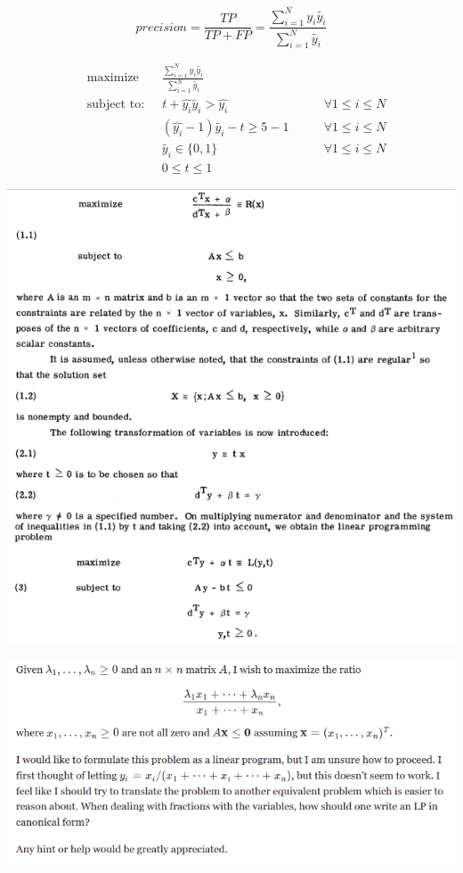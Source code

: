\documentclass[a4paper]{article}
\begin{document}
\pagebreak

\[
precision = \frac{TP}{TP+FP} = \frac{\sum_{i=1}^{N} y_i \tilde{y_i}}{\sum_{i=1}^{N} \tilde{y_i}}
\]

\begin{equation}
\begin{aligned}
&\text{maximize} \quad \: \: \: \: \frac{\sum_{i=1}^{N} y_i \tilde{y_i}}{\sum_{i=1}^{N} \tilde{y_i}} \\
& \text{subject to:} \quad \: \: t + \hat{y_i} \tilde{y_i} > \hat{y_i} \qquad &\forall 1\le i \le N\\
& \qquad \qquad \qquad  (\hat{y_i} - 1) \tilde{y_i} - t \ge 5 -1 \qquad &\forall 1\le i \le N\\
& \qquad \qquad \qquad \tilde{y_i} \in \{0, 1\} \qquad &\forall 1\le i \le N\\
& \qquad \qquad \qquad 0 \le t \le 1
\end{aligned}
\end{equation}

\pagebreak

\begin{center}
	\includegraphics[width=0.75\textheight]{lfp_1}
\end{center}

\pagebreak

\begin{center}
	\includegraphics[width=0.75\textheight]{lfp_2}
\end{center}
\end{document}
